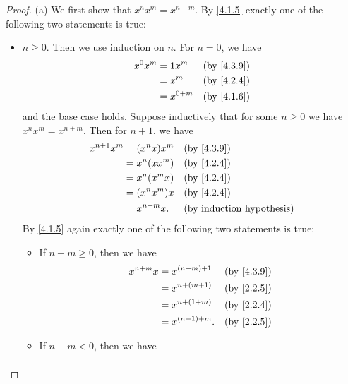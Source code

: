 \begin{proof}{(a)}
  We first show that \(x^n x^m = x^{n + m}\).
  By \cref{4.1.5} exactly one of the following two statements is true:
  \begin{itemize}
    \item \(n \geq 0\).
          Then we use induction on \(n\).
          For \(n = 0\), we have
          \begin{align*}
            x^0 x^m & = 1x^m      &  & \text{(by \cref{4.3.9})} \\
                    & = x^m       &  & \text{(by \cref{4.2.4})} \\
                    & = x^{0 + m} &  & \text{(by \cref{4.1.6})}
          \end{align*}
          and the base case holds.
          Suppose inductively that for some \(n \geq 0\) we have \(x^n x^m = x^{n + m}\).
          Then for \(n + 1\), we have
          \begin{align*}
            x^{n + 1} x^m & = (x^n x) x^m  &  & \text{(by \cref{4.3.9})}         \\
                          & = x^n (x x^m)  &  & \text{(by \cref{4.2.4})}         \\
                          & = x^n (x^m x)  &  & \text{(by \cref{4.2.4})}         \\
                          & = (x^n x^m) x  &  & \text{(by \cref{4.2.4})}         \\
                          & = x^{n + m} x. &  & \text{(by induction hypothesis)}
          \end{align*}
          By \cref{4.1.5} again exactly one of the following two statements is true:
          \begin{itemize}
            \item If \(n + m \geq 0\), then we have
                  \begin{align*}
                    x^{n + m} x & = x^{(n + m) + 1}  &  & \text{(by \cref{4.3.9})} \\
                                & = x^{n + (m + 1)}  &  & \text{(by \cref{2.2.5})} \\
                                & = x^{n + (1 + m)}  &  & \text{(by \cref{2.2.4})} \\
                                & = x^{(n + 1) + m}. &  & \text{(by \cref{2.2.5})}
                  \end{align*}
            \item If \(n + m < 0\), then we have
                  \begin{align*}

\end{align*}
\end{itemize}
\end{itemize}
\end{proof}
